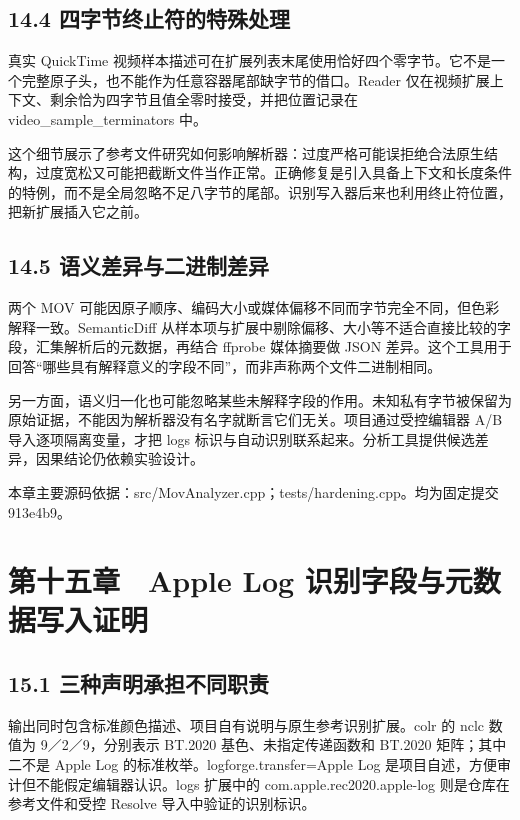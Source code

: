 \documentclass[UTF8,zihao=-4,openany]{ctexbook}
\begin{document}
\section*{14.4 四字节终止符的特殊处理}
真实 QuickTime 视频样本描述可在扩展列表末尾使用恰好四个零字节。它不是一个完整原子头，也不能作为任意容器尾部缺字节的借口。Reader 仅在视频扩展上下文、剩余恰为四字节且值全零时接受，并把位置记录在 video\_sample\_terminators 中。

这个细节展示了参考文件研究如何影响解析器：过度严格可能误拒绝合法原生结构，过度宽松又可能把截断文件当作正常。正确修复是引入具备上下文和长度条件的特例，而不是全局忽略不足八字节的尾部。识别写入器后来也利用终止符位置，把新扩展插入它之前。


\section*{14.5 语义差异与二进制差异}
两个 MOV 可能因原子顺序、编码大小或媒体偏移不同而字节完全不同，但色彩解释一致。SemanticDiff 从样本项与扩展中剔除偏移、大小等不适合直接比较的字段，汇集解析后的元数据，再结合 ffprobe 媒体摘要做 JSON 差异。这个工具用于回答“哪些具有解释意义的字段不同”，而非声称两个文件二进制相同。

另一方面，语义归一化也可能忽略某些未解释字段的作用。未知私有字节被保留为原始证据，不能因为解析器没有名字就断言它们无关。项目通过受控编辑器 A/B 导入逐项隔离变量，才把 logs 标识与自动识别联系起来。分析工具提供候选差异，因果结论仍依赖实验设计。


\par\small 本章主要源码依据：src/MovAnalyzer.cpp；tests/hardening.cpp。均为固定提交 913e4b9。\normalsize

\chapter*{第十五章　Apple Log 识别字段与元数据写入证明}

\section*{15.1 三种声明承担不同职责}
输出同时包含标准颜色描述、项目自有说明与原生参考识别扩展。colr 的 nclc 数值为 9／2／9，分别表示 BT.2020 基色、未指定传递函数和 BT.2020 矩阵；其中二不是 Apple Log 的标准枚举。logforge.transfer=Apple Log 是项目自述，方便审计但不能假定编辑器认识。logs 扩展中的 com.apple.rec2020.apple-log 则是仓库在参考文件和受控 Resolve 导入中验证的识别标识。
\end{document}
